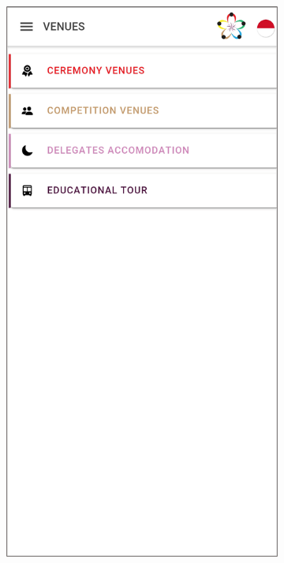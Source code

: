 \begin{figure}[H]
     \centering
     \begin{subfigure}[b]{0.3\textwidth}
         \centering
         \includegraphics[width=\textwidth]{Gambar/SSVenues.png}

\end{subfigure}
\end{figure}
